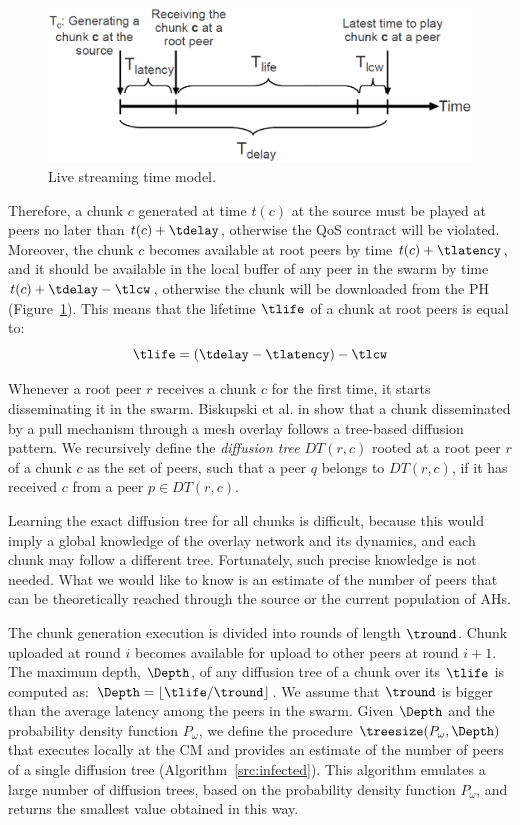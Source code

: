 \begin{figure}[t]
\centering
\includegraphics[width=1.0\columnwidth, trim=0 70 0 0]{tlife}
\vspace{3mm}
\caption{\small Live streaming time model.}
\label{fig:tlife}
\end{figure}

Therefore, a chunk $c$ generated at time $t(c)$ at the source must be played
at peers no later than $t(c) + \tdelay$, otherwise the QoS contract will be
violated. Moreover, the chunk $c$ becomes available at root peers by time
$t(c) + \tlatency$, and it should be available in the local buffer of any peer
in the swarm by time $t(c) + \tdelay - \tlcw$, otherwise the chunk will be
downloaded from the PH (Figure~\ref{fig:tlife}). This means that the lifetime
$\tlife$ of a chunk at root peers is equal to:
\begin{equation}
\tlife = (\tdelay - \tlatency) - \tlcw \label{tlife}
\end{equation}

Whenever a root peer $r$ receives a chunk $c$ for the first time, it starts
disseminating it in the swarm. Biskupski et al. in \cite{treebasedmesh} show
that a chunk disseminated by a pull mechanism through a mesh overlay follows a
tree-based diffusion pattern. We recursively define the {\em diffusion tree} $DT(r, c)$
rooted at a root peer $r$ of a chunk $c$ as the set of peers, such that a peer
$q$ belongs to $DT(r, c)$, if it has received $c$ from a peer $p \in DT(r, c)$.

Learning the exact diffusion tree for all chunks is difficult, because this
would imply a global knowledge of the overlay network and its dynamics, and
each chunk may follow a different tree. Fortunately, such precise knowledge is
not needed. What we would like to know is an estimate of the number of peers
that can be theoretically reached through the source or the current population
of AHs.

The chunk generation execution is divided into rounds of length $\tround$.
Chunk uploaded at round $i$ becomes available for upload to other peers at
round $i+1$. The maximum depth, $\Depth$, of any diffusion tree of a chunk
over its $\tlife$ is computed as: $\Depth = \lfloor \tlife / \tround \rfloor$.
We assume that $\tround$ is bigger than the average latency among the peers in
the swarm. Given $\Depth$ and the probability density function $P_{\omega}$,
we define the procedure $\treesize(P_{\omega}, \Depth)$ that executes locally
at the CM and provides an estimate of the number of peers of a single diffusion
tree (Algorithm~\ref{src:infected}). This algorithm emulates a large number of
diffusion trees, based on the probability density function $P_{\omega}$, and
returns the smallest value obtained in this way.

